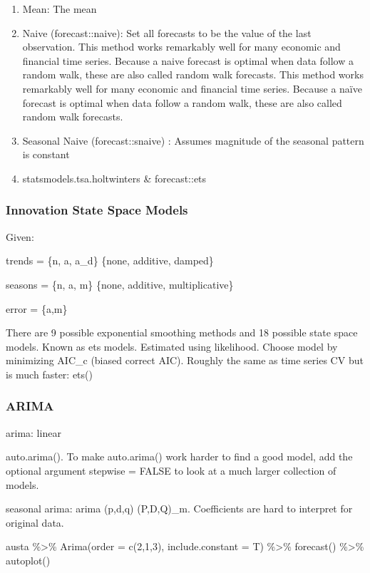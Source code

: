 \documentclass[]{book}
\begin{document}
\begin{enumerate}
\def\labelenumi{\arabic{enumi}.}
\setcounter{enumi}{-1}
\item
  Mean: The mean
\item
  Naive (forecast::naive): Set all forecasts to be the value of the last observation. This method works remarkably well for many economic and financial time series. Because a naive forecast is optimal when data follow a random walk, these are also called random walk forecasts. This method works remarkably well for many economic and financial time series. Because a naïve forecast is optimal when data follow a random walk, these are also called random walk forecasts.
\item
  Seasonal Naive (forecast::snaive) : Assumes magnitude of the seasonal pattern is constant
\item
  statsmodels.tsa.holtwinters \& forecast::ets
\end{enumerate}

\hypertarget{innovation-state-space-models}{%
\subsubsection{Innovation State Space Models}\label{innovation-state-space-models}}

Given:

trends = \{n, a, a\_d\} \{none, additive, damped\}

seasons = \{n, a, m\} \{none, additive, multiplicative\}

error = \{a,m\}

There are 9 possible exponential smoothing methods and 18 possible state space models. Known as ets models. Estimated using likelihood. Choose model by minimizing AIC\_c (biased correct AIC). Roughly the same as time series CV but is much faster: ets()

\hypertarget{arima}{%
\subsubsection{ARIMA}\label{arima}}

arima: linear

auto.arima(). To make auto.arima() work harder to find a good model, add the optional argument stepwise = FALSE to look at a much larger collection of models.

seasonal arima: arima (p,d,q) (P,D,Q)\_m. Coefficients are hard to interpret for original data.

austa \%\textgreater{}\% Arima(order = c(2,1,3), include.constant = T) \%\textgreater{}\% forecast() \%\textgreater{}\% autoplot()
\end{document}
